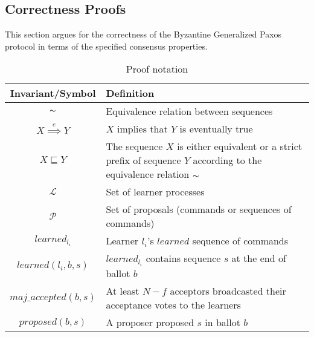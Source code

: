 \subsection{Correctness Proofs}

This section argues for the correctness of the Byzantine Generalized Paxos protocol in terms of the specified consensus properties.\par


\begin{table}[h!]
	\renewcommand{\arraystretch}{1.5}
	\centering
	\begin{tabularx}{\linewidth}{ |c|X|}
		\hline
		Invariant/Symbol & Definition \\
		\hline
		$\thicksim$ & Equivalence relation between sequences \\
		\hline
		$X \overset{e}{\implies} Y$ & $X$ implies that $Y$ is eventually true \\
		\hline
		$X \sqsubseteq Y$ & The sequence $X$ is either equivalent or a strict prefix of sequence $Y$ according to the equivalence relation $\thicksim$ \\
		\hline
		$\mathcal{L}$ & Set of learner processes \\
		\hline
		$\mathcal{P}$ & Set of proposals (commands or sequences of commands) \\
		\hline
		$learned_{l_i}$ & Learner $l_i$'s $learned$ sequence of commands \\
		\hline
		$learned(l_i,b,s)$ & $learned_{l_i}$ contains sequence $s$ at the end of ballot $b$  \\
		\hline
		$maj\_accepted(b,s)$ & At least $N-f$ acceptors broadcasted their acceptance votes to the learners\\
		\hline
		$proposed(b,s)$ & A proposer proposed $s$ in ballot $b$ \\
		\hline
		
  	\end{tabularx} 
	\caption{Proof notation} 
	\label{table:1}
\end{table}

